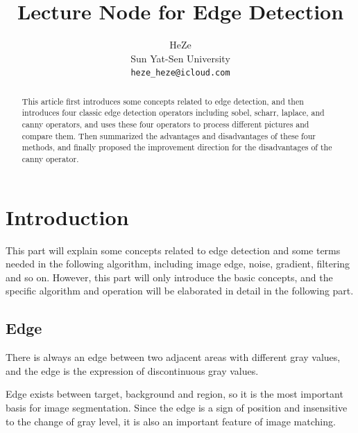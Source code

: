 \documentclass[review]{cvpr}
\begin{document}
\title{Lecture Node for Edge Detection}

\author{HeZe\\
Sun Yat-Sen University\\
{\tt\small heze_heze@icloud.com}
}

\maketitle


\begin{abstract}
   This article first introduces some concepts related to edge detection, and then introduces four classic edge detection operators including sobel, scharr, laplace, and canny operators, and uses these four operators to process different pictures and compare them. Then summarized the advantages and disadvantages of these four methods, and finally proposed the improvement direction for the disadvantages of the canny operator.
\end{abstract}

\section{Introduction}

This part will explain some concepts related to edge detection and some terms needed in the following algorithm, including image edge, noise, gradient, filtering and so on. However, this part will only introduce the basic concepts, and the specific algorithm and operation will be elaborated in detail in the following part.

\subsection{Edge}

There is always an edge between two adjacent areas with different gray values, and the edge is the expression of discontinuous gray values.

Edge exists between target, background and region, so it is the most important basis for image segmentation. Since the edge is a sign of position and insensitive to the change of gray level, it is also an important feature of image matching.
\end{document}
